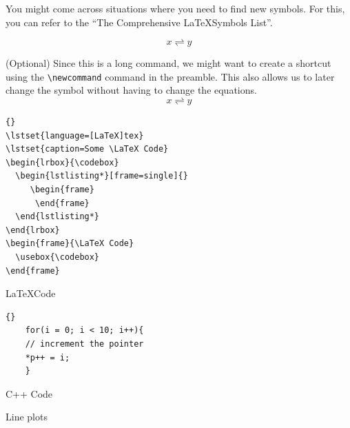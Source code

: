 \documentclass{beamer}
\newcommand{\flow}{\rightleftharpoons}
\begin{document}
\begin{frame}
You might come across situations where you need to find new symbols. For this, you can refer to the ``The Comprehensive \LaTeX Symbols List''.  

\[ x \rightleftharpoons  y \]


(Optional) Since this is a long command, we might want to create a shortcut using the \Verb|\newcommand| command in the preamble. This also allows us to later change the symbol without having to change the equations. 
\[ x \flow y \]
\end{frame}




\lstset{language=[LaTeX]tex}
\lstset{caption=Some \LaTeX Code}
\begin{lrbox}{\codebox}
\begin{lstlisting}[frame=single]{}
\lstset{language=[LaTeX]tex}
\lstset{caption=Some \LaTeX Code}
\begin{lrbox}{\codebox}
  \begin{lstlisting*}[frame=single]{}
     \begin{frame}
	  \end{frame}
  \end{lstlisting*}
\end{lrbox}
\begin{frame}{\LaTeX Code}
  \usebox{\codebox}
\end{frame}	
\end{lstlisting}
\end{lrbox}
\begin{frame}{\LaTeX Code}
	\usebox{\codebox}
\end{frame}



\lstset{language=c++}
\lstset{caption=Some C++ Code}
\begin{lrbox}{\codebox}
	\begin{lstlisting}[frame=single, basicstyle=\ttfamily]{}
	for(i = 0; i < 10; i++){
	// increment the pointer
	*p++ = i;
	}
	\end{lstlisting}
\end{lrbox}
\begin{frame}{C++ Code}
	\usebox{\codebox}
\end{frame}




\begin{frame}{Line plots}
	\begin{figure}
	\end{figure}
\end{frame}
\end{document}
